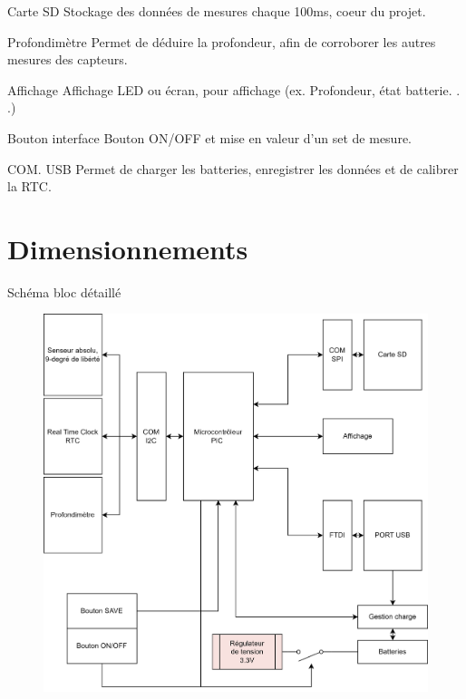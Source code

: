 \documentclass[compress,aspectratio=169]{beamer}
\begin{document}
\begin{frame}
	\vspace{+3mm}
	\begin{block}{Carte SD}
		Stockage des données de mesures chaque 100ms, coeur du projet.
	\end{block}

	\begin{block}{Profondimètre}
		Permet de déduire la profondeur, afin de corroborer les autres mesures des capteurs.
	\end{block}

	\begin{block}{Affichage}
		Affichage LED ou écran, pour affichage  (ex. Profondeur, état batterie. . .)
	\end{block}
	
	\begin{block}{Bouton interface}
		 Bouton ON/OFF et mise en valeur d’un set de mesure.
	\end{block}
	
	\begin{block}{COM. USB}
		Permet de charger les batteries, enregistrer les données et de calibrer la RTC.
	\end{block}
\end{frame}
 

\section{Dimensionnements}
\begin{frame}[containsverbatim]{Schéma bloc détaillé}
	\begin{figure}[h]
		\centering
		\includegraphics[width=0.5\linewidth]{Images/Schema-bloc-LocalisationSousMarin}
	\end{figure}
\end{frame}
\end{document}
